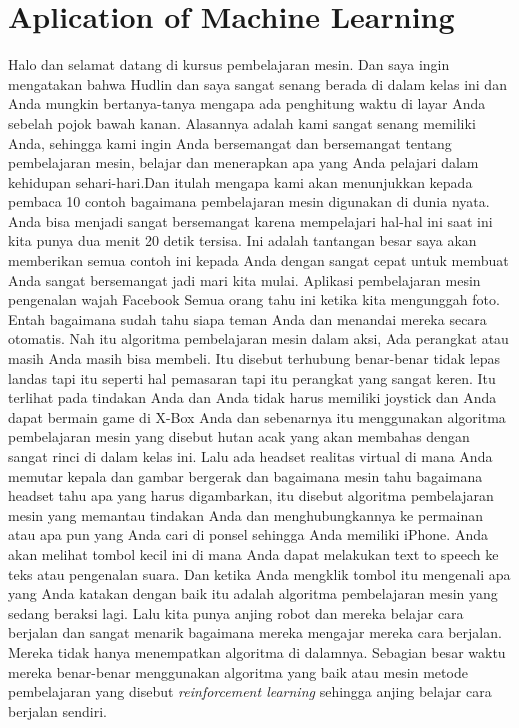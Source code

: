 \section{Aplication of Machine Learning}
Halo dan selamat datang di kursus pembelajaran mesin. Dan saya ingin mengatakan bahwa Hudlin dan saya sangat senang berada di dalam kelas ini dan Anda mungkin bertanya-tanya mengapa ada penghitung waktu di layar Anda sebelah pojok bawah kanan. Alasannya adalah kami sangat senang memiliki Anda, sehingga kami ingin Anda bersemangat dan bersemangat tentang pembelajaran mesin, belajar dan menerapkan apa yang Anda pelajari dalam kehidupan sehari-hari.Dan itulah mengapa kami akan menunjukkan kepada pembaca 10 contoh bagaimana pembelajaran mesin digunakan di dunia nyata. Anda bisa menjadi sangat bersemangat karena mempelajari hal-hal ini saat ini kita punya dua menit 20 detik tersisa. Ini adalah tantangan besar saya akan memberikan semua contoh ini kepada Anda dengan sangat cepat untuk membuat Anda sangat bersemangat jadi mari kita mulai. Aplikasi pembelajaran mesin pengenalan wajah Facebook Semua orang tahu ini ketika kita mengunggah foto. Entah bagaimana sudah tahu siapa teman Anda dan menandai mereka secara otomatis. Nah itu algoritma pembelajaran mesin dalam aksi, Ada perangkat atau masih Anda masih bisa membeli. Itu disebut terhubung benar-benar tidak lepas landas tapi itu seperti hal pemasaran tapi itu perangkat yang sangat keren. Itu terlihat pada tindakan Anda dan Anda tidak harus memiliki joystick dan Anda dapat bermain game di X-Box Anda dan sebenarnya itu menggunakan algoritma pembelajaran mesin yang disebut hutan acak yang akan membahas dengan sangat rinci di dalam kelas ini. Lalu ada headset realitas virtual di mana Anda memutar kepala dan gambar bergerak dan bagaimana mesin tahu bagaimana headset tahu apa yang harus digambarkan, itu disebut algoritma pembelajaran mesin yang memantau tindakan Anda dan menghubungkannya ke permainan atau apa pun yang Anda cari di ponsel sehingga Anda memiliki iPhone. Anda akan melihat tombol kecil ini di mana Anda dapat melakukan text to speech ke teks atau pengenalan suara. Dan ketika Anda mengklik tombol itu mengenali apa yang Anda katakan dengan baik itu adalah algoritma pembelajaran mesin yang sedang beraksi lagi. Lalu kita punya anjing robot dan mereka belajar cara berjalan dan sangat menarik bagaimana mereka mengajar mereka cara berjalan. Mereka tidak hanya menempatkan algoritma di dalamnya. Sebagian besar waktu mereka benar-benar menggunakan algoritma yang baik atau mesin metode pembelajaran yang disebut \textit{reinforcement learning} sehingga anjing belajar cara berjalan sendiri.

